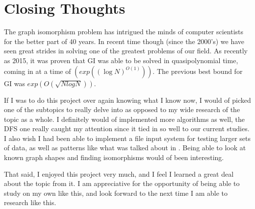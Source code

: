 \documentclass[notitlepage]{report}
\begin{document}
\section*{Closing Thoughts}
The graph isomorphism problem has intrigued the minds of computer scientists for the better part of 40 years. In recent time though (since the 2000's) we have seen great strides in solving one of the greatest problems of our field. As recently as 2015, it was proven that GI was able to be solved in quasipolynomial time, coming in at a time of $(exp((\log N)^{O(1)}))$. The previous best bound for GI was $exp(O(\sqrt{N log N}))$.~\cite{babal}

If I was to do this project over again knowing what I know now, I would of picked one of the subtopics to really delve into as opposed to my wide research of the topic as a whole. I definitely would of implemented more algorithms as well, the DFS one really caught my attention since it tied in so well to our current studies. I also wish I had been able to implement a file input system for testing larger sets of data, as well as patterns like what was talked about in \cite{tolley}. Being able to look at known graph shapes and finding isomorphisms would of been interesting.

That said, I enjoyed this project very much, and I feel I learned a great deal about the topic from it. I am appreciative for the opportunity of being able to study on my own like this, and look forward to the next time I am able to research like this.




\end{document}
